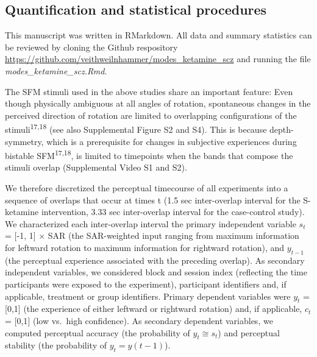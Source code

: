 \documentclass[
]{article}
\begin{document}
\subsection{Quantification and statistical
procedures}\label{quantification-and-statistical-procedures}

This manuscript was written in RMarkdown. All data and summary
statistics can be reviewed by cloning the Github respository
\url{https://github.com/veithweilnhammer/modes_ketamine_scz} and running
the file \emph{modes\_ketamine\_scz.Rmd}.

The SFM stimuli used in the above studies share an important feature:
Even though physically ambiguous at all angles of rotation, spontaneous
changes in the perceived direction of rotation are limited to
overlapping configurations of the stimuli\textsuperscript{17,18} (see
also Supplemental Figure S2 and S4). This is because depth-symmetry,
which is a prerequisite for changes in subjective experiences during
bistable SFM\textsuperscript{17,18}, is limited to timepoints when the
bands that compose the stimuli overlap (Supplemental Video S1 and S2).

We therefore discretized the perceptual timecourse of all experiments
into a sequence of overlaps that occur at times t (1.5 sec inter-overlap
interval for the S-ketamine intervention, 3.33 sec inter-overlap
interval for the case-control study). We characterized each
inter-overlap interval the primary independent variable \(s_t\) = {[}-1,
1{]} \(\times\) SAR (the SAR-weighted input ranging from maximum
information for leftward rotation to maximum information for rightward
rotation), and \(y_{t-1}\) (the perceptual experience associated with
the preceding overlap). As secondary independent variables, we
considered block and session index (reflecting the time participants
were exposed to the experiment), participant identifiers and, if
applicable, treatment or group identifiers. Primary dependent variables
were \(y_t\) = {[}0,1{]} (the experience of either leftward or rightward
rotation) and, if applicable, \(c_t\) = {[}0,1{]} (low vs.~high
confidence). As secondary dependent variables, we computed perceptual
accuracy (the probability of \(y_t \cong s_t\)) and perceptual stability
(the probability of \(y_t = y(t - 1)\)).
\end{document}
